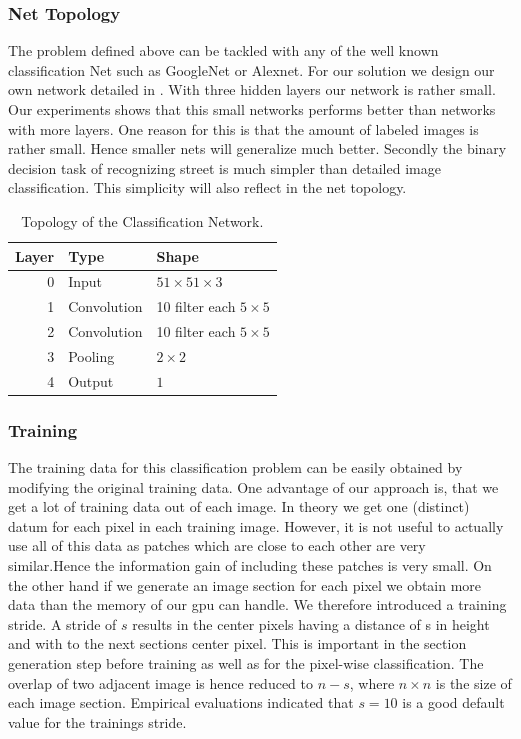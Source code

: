 \subsubsection{Net Topology}
The problem defined above can be tackled with any of the well known
classification Net such as GoogleNet or Alexnet. For our solution we design our
own network detailed in . With three hidden layers our network
is rather small. Our experiments shows that this small networks performs better
than networks with more layers. One reason for this is that the amount of
labeled images is rather small. Hence smaller nets will generalize much better.
Secondly the binary decision task of recognizing street is much simpler than
detailed image classification. This simplicity will also reflect in the net
topology.

\begin{table}[H]
	\normalsize
	\centering
\begin{tabular}{r  l l}
	\toprule
	\textbf{Layer} & \textbf{Type}  & \textbf{Shape}  \\
	\midrule
	0     & Input &  $51 \times 51 \times 3$ \\
	1     & Convolution & 10 filter  each $5 \times 5$ \\
	2     & Convolution & 10 filter  each $5 \times 5$  \\
	3     & Pooling     & $2 \times 2$ \\
	4     & Output     & $1$ \\
	\bottomrule
\end{tabular}
\caption{Topology of the Classification Network.}
\label{tab:topo}
\end{table}

\subsubsection{Training}

The training data for this classification problem can be easily obtained by modifying the original training data. One advantage of our approach is, that we get a lot of training data out of each image. In theory we get one (distinct) datum for each pixel in each training image. However, it is not useful to actually use all of this data as patches which are close to each other are very similar.Hence the information gain of including these patches is very small. On the other hand if we generate an image section for each pixel we obtain more data than the memory of our gpu can handle. We therefore introduced a training stride. A stride of $s$ results in the center pixels having a distance of s in height and with to the next sections center pixel. This is important in the section generation step before training as well as for the pixel-wise classification. The overlap of two adjacent image is hence reduced to $n-s$, where $n \times n$ is the size of each image section. Empirical evaluations indicated that $s=10$ is a good default value for the trainings stride.



